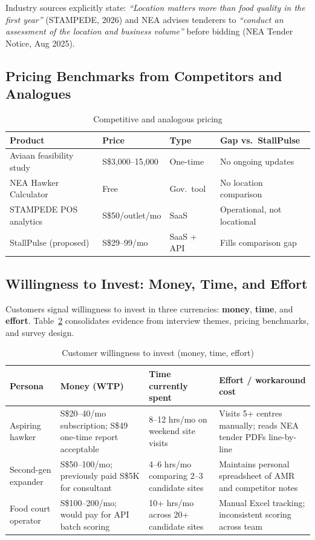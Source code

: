 \documentclass[11pt,a4paper]{article}
\begin{document}
Industry sources explicitly state: \textit{``Location matters more than food quality in the first year''} (STAMPEDE, 2026) and NEA advises tenderers to \textit{``conduct an assessment of the location and business volume''} before bidding (NEA Tender Notice, Aug 2025).

\subsection{Pricing Benchmarks from Competitors and Analogues}

\begin{table}[H]
\centering
\caption{Competitive and analogous pricing}
\label{tab:pricing}
\begin{tabular}{@{}llll@{}}
\toprule
\textbf{Product} & \textbf{Price} & \textbf{Type} & \textbf{Gap vs.\ StallPulse} \\
\midrule
Aviaan feasibility study & S\$3,000--15,000 & One-time & No ongoing updates \\
NEA Hawker Calculator & Free & Gov.\ tool & No location comparison \\
STAMPEDE POS analytics & S\$50/outlet/mo & SaaS & Operational, not locational \\
StallPulse (proposed) & S\$29--99/mo & SaaS + API & Fills comparison gap \\
\bottomrule
\end{tabular}
\end{table}

\subsection{Willingness to Invest: Money, Time, and Effort}
\label{sec:wtp}

Customers signal willingness to invest in three currencies: \textbf{money}, \textbf{time}, and \textbf{effort}. Table~\ref{tab:wtp} consolidates evidence from interview themes, pricing benchmarks, and survey design.

\begin{table}[H]
\centering
\caption{Customer willingness to invest (money, time, effort)}
\label{tab:wtp}
\begin{tabular}{@{}p{2.8cm}p{3.2cm}p{3.5cm}p{3.8cm}@{}}
\toprule
\textbf{Persona} & \textbf{Money (WTP)} & \textbf{Time currently spent} & \textbf{Effort / workaround cost} \\
\midrule
Aspiring hawker &
S\$20--40/mo subscription; S\$49 one-time report acceptable &
8--12 hrs/mo on weekend site visits &
Visits 5+ centres manually; reads NEA tender PDFs line-by-line \\
\addlinespace
Second-gen expander &
S\$50--100/mo; previously paid S\$5K for consultant &
4--6 hrs/mo comparing 2--3 candidate sites &
Maintains personal spreadsheet of AMR and competitor notes \\
\addlinespace
Food court operator &
S\$100--200/mo; would pay for API batch scoring &
10+ hrs/mo across 20+ candidate sites &
Manual Excel tracking; inconsistent scoring across team \\
\bottomrule
\end{tabular}
\end{table}
\end{document}
